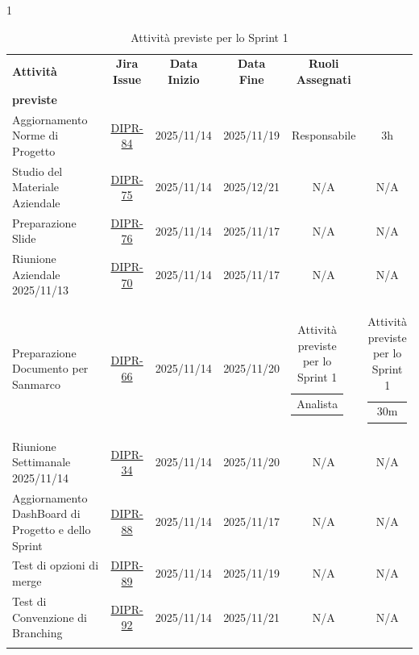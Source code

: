 \documentclass[a4paper,12pt]{article}
\begin{document}
    \begin{spacing}{1}
    \small
    \begin{longtable}{|p{4cm}|c|c|c|c|c|}
        \hline
        \rowcolor{zpusgreen!30}
        \textbf{Attività} & \textbf{Jira Issue} & \textbf{Data Inizio} & \textbf{Data Fine} & \textbf{Ruoli Assegnati} & \begin{tabular}[c]{@{}c@{}} \textbf{Ore} \\ \textbf{previste} \end{tabular} \\
        \hline
        Aggiornamento Norme di Progetto & \href{https://7zpus.atlassian.net/browse/DIPR-84}{DIPR-84} & 2025/11/14 & 2025/11/19 & Responsabile & 3h \\
        \hline
        Studio del Materiale Aziendale & \href{https://7zpus.atlassian.net/browse/DIPR-75}{DIPR-75} & 2025/11/14 & 2025/12/21 & N/A & N/A \\
        \hline
        Preparazione Slide & \href{https://7zpus.atlassian.net/browse/DIPR-76}{DIPR-76} & 2025/11/14 & 2025/11/17 & N/A & N/A\\
        \hline
        Riunione Aziendale 2025/11/13 & \href{https://7zpus.atlassian.net/browse/DIPR-70}{DIPR-70} & 2025/11/14 & 2025/11/17 & N/A & N/A\\
        \hline
        Preparazione Documento per Sanmarco& \href{https://7zpus.atlassian.net/browse/DIPR-66}{DIPR-66}& 2025/11/14& 2025/11/20& \begin{tabular}[c]{@{}c@{}} Analista \end{tabular} & \begin{tabular}[c]{@{}c@{}} 30m \end{tabular} \\
        \hline
        Riunione Settimanale 2025/11/14 & \href{https://7zpus.atlassian.net/browse/DIPR-34}{DIPR-34} & 2025/11/14 & 2025/11/20 & N/A & N/A \\
        \hline
        Aggiornamento DashBoard  di Progetto e dello Sprint & \href{https://7zpus.atlassian.net/browse/DIPR-88}{DIPR-88} & 2025/11/14 & 2025/11/17 & N/A & N/A \\
        \hline
        Test di opzioni di merge & \href{https://7zpus.atlassian.net/browse/DIPR-89}{DIPR-89} & 2025/11/14 & 2025/11/19 & N/A & N/A \\
        \hline
        Test di Convenzione di Branching & \href{https://7zpus.atlassian.net/browse/DIPR-92}{DIPR-92} & 2025/11/14 & 2025/11/21 & N/A & N/A \\\hline
        \rowcolor{white}
        \caption{Attività previste per lo Sprint 1}
    \end{longtable}
    \end{spacing}
    
\end{document}
